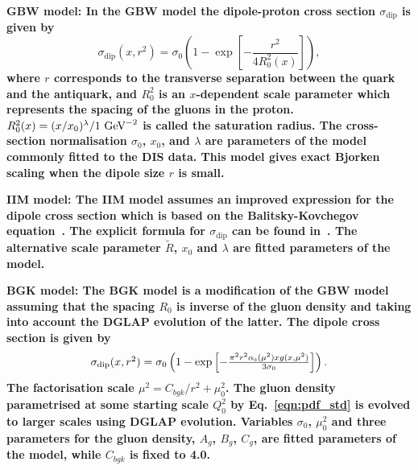 \begin{description}
\item \bf {GBW model:} \rm
In the GBW model the dipole-proton cross section $\sigma_{\text{dip}}$ is given by
\begin{equation}
\label{eGBW}
   \sigma_{\text{dip}}(x,r^{2}) = \sigma_{0} \left(1 - \exp \left[-\frac{r^{2}}{4R_{0}^{2}(x)} \right]\right),
\end{equation}
where $r$ corresponds to the transverse separation between the quark and the antiquark, and $R_{0}^{2}$
 is 
an $x$-dependent scale parameter which represents the spacing of the gluons in the proton. 
$R_0^2(x) = (x/x_0)^\lambda/1\,{\rm \,\text{Ge\hspace{-.08em}V}}^{-2}$ is called the saturation radius.
The cross-section normalisation $\sigma_0$, $x_0$, and $\lambda$ are parameters 
of the model commonly fitted to the DIS data.
This model gives exact Bjorken scaling when the dipole size $r$ is small.

\vspace{0.1cm}
\item \bf {IIM model:} \rm
The IIM model assumes an improved expression for the dipole cross section which is based on the 
Balitsky-Kovchegov equation~\cite{Balitsky:1995ub}. The explicit formula for $\sigma_{\text{dip}}$ 
can be found in~\cite{Iancu:2003ge}. 
The alternative scale parameter $\tilde{R}$, $x_{0}$ and $\lambda$ are fitted parameters of the model.

\vspace{0.1cm}
\item \bf {BGK model:} \rm
The BGK model is a modification of the GBW model assuming that the
spacing $R_0$ is inverse of the gluon density and taking
into account the DGLAP evolution of the latter.
The dipole cross section is given by
\begin{equation}
\begin{array}{lcl}
   \sigma_{\text{dip}}(x,r^{2})  =  \sigma_{0} 
\left(1 - \exp \left[-\frac{\pi^{2} r^{2} \alpha_\mathrm{s} (\mu^{2}) xg(x,\mu^{2})}{3 \sigma_{0}} \right]\right).
\end{array}
\label{eBGK}
\end{equation}
The factorisation scale $\mu^{2} = C_{bgk}/r^{2}+\mu^{2}_{0}$.
The gluon density parametrised at some starting scale $Q_{0}^{2}$ by Eq.~\ref{eqn:pdf_std}
is evolved to larger scales using DGLAP evolution.
Variables $\sigma_{0}$, $\mu^{2}_{0}$ and three parameters for the gluon density, $A_{g}$, $B_{g}$, $C_{g}$,
are fitted parameters of the model, while $C_{bgk}$ is fixed to 4.0.


\end{description}
